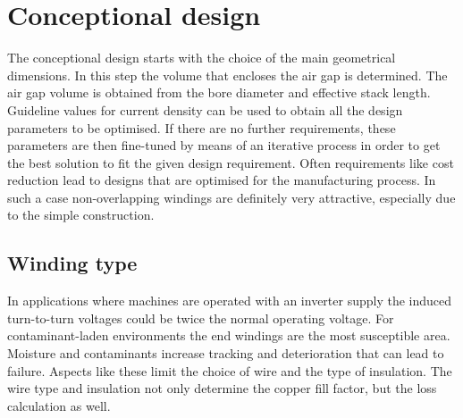 
\section{Conceptional design}
The conceptional design starts with the choice of the main geometrical dimensions. In this step the volume that encloses the air gap is determined. The air gap volume is obtained from the bore diameter and effective stack length. Guideline values for current density can be used to obtain all the design parameters to be optimised. 
If there are no further requirements, these parameters are then fine-tuned by means of an iterative process in order to get the best solution to fit the given design requirement.    
Often requirements like cost reduction lead to designs that are optimised for the manufacturing process. In such a case non-overlapping windings are definitely very attractive, especially due to the simple construction. 

\subsection{Winding type}
In applications where machines are operated with an inverter supply the induced turn-to-turn voltages could be twice the normal operating voltage. For contaminant-laden environments the end windings are the most susceptible area. Moisture and contaminants increase tracking and deterioration that can lead to failure. Aspects like these limit the choice of wire and the type of insulation. The wire type and insulation not only determine the copper fill factor, but the loss calculation as well.

